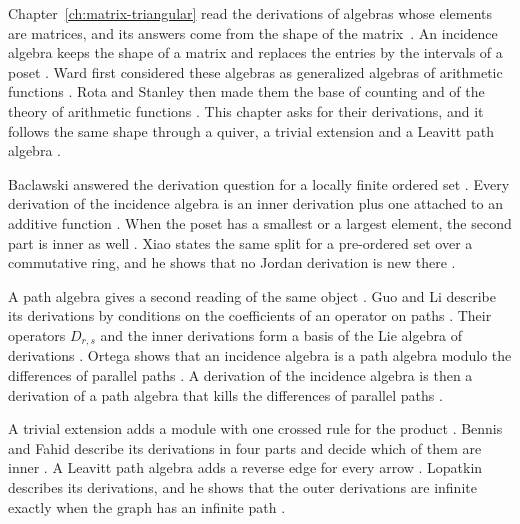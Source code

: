 Chapter~\ref{ch:matrix-triangular} read the derivations of algebras whose elements
are matrices, and its answers come from the shape of the matrix~\cite[p.~59]{Lopatkin2019}. An incidence
algebra keeps the shape of a matrix and replaces the entries by the intervals of a
poset \cite[p.~1358]{Xiao2015}. Ward first considered these algebras as generalized
algebras of arithmetic functions \cite[p.~1358]{Xiao2015}. Rota and Stanley then
made them the base of counting and of the theory of arithmetic functions
\cite[p.~1358]{Xiao2015}. This chapter asks for their derivations, and it
follows the same shape through a quiver, a trivial extension and a Leavitt path
algebra \cite[p.~59]{Lopatkin2019}.

Baclawski answered the derivation question for a locally finite ordered set
\cite[p.~352]{Baclawski1972}. Every derivation of the incidence algebra is an
inner derivation plus one attached to an additive function \cite[Theorem~2,
p.~352]{Baclawski1972}. When the poset has a smallest or a largest element,
the second part is inner as well \cite[p.~354]{Baclawski1972}. Xiao states the
same split for a pre-ordered set over a commutative ring, and he shows that no
Jordan derivation is new there \cite[Theorem~3.3, p.~1366]{Xiao2015}.

A path algebra gives a second reading of the same object
\cite[p.~81]{LiWei2018}. Guo and Li describe its derivations by conditions on
the coefficients of an operator on paths \cite[Theorem~2.3,
p.~548]{GuoLi2014}. Their operators $D_{r,s}$ and the inner derivations form a
basis of the Lie algebra of derivations \cite[Theorem~3.4, p.~555]{GuoLi2014}.
Ortega shows that an incidence algebra is a path algebra modulo the
differences of parallel paths \cite[p.~232]{Ortega2006}. A derivation of the
incidence algebra is then a derivation of a path algebra that kills the
differences of parallel paths \cite[p.~232]{Ortega2006}.

A trivial extension adds a module with one crossed rule for the product
\cite[p.~4]{BennisFahid2017}. Bennis and Fahid describe its derivations in
four parts and decide which of them are inner \cite[Theorem~3.12,
p.~14]{BennisFahid2017}. A Leavitt path algebra adds a reverse edge for every
arrow \cite[p.~61]{Lopatkin2019}. Lopatkin describes its derivations, and he
shows that the outer derivations are infinite exactly when the graph has an
infinite path \cite[Corollary~3.8, p.~79]{Lopatkin2019}.

